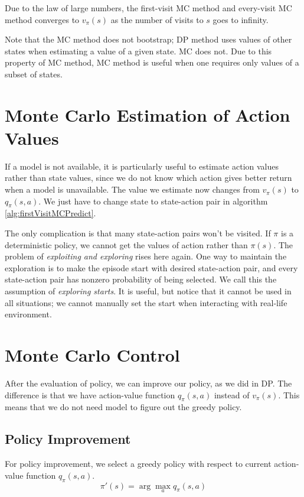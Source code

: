\documentclass[../../main.tex]{subfiles}
\begin{document}
    Due to the law of large numbers, the first-visit MC method and every-visit MC method converges to $v_\pi(s)$ as the number of visits to $s$ goes to infinity.

    Note that the MC method does not bootstrap; DP method uses values of other states when estimating a value of a given state. MC does not.
    Due to this property of MC method, MC method is useful when one requires only values of a subset of states.

\section{Monte Carlo Estimation of Action Values}
    If a model is not available, it is particularly useful to estimate action values rather than state values,
    since we do not know which action gives better return when a model is unavailable.
    The value we estimate now changes from $v_\pi(s)$ to $q_\pi(s,a)$. We just have to change state to state-action pair in algorithm \ref{alg:firstVisitMCPredict}.
    
    The only complication is that many state-action pairs won't be visited. If $\pi$ is a deterministic policy, we cannot get the
    values of action rather than $\pi(s)$. The problem of \emph{exploiting and exploring} rises here again. One way to maintain the exploration is to
    make the episode start with desired state-action pair, and every state-action pair has nonzero probability of being selected.
    We call this the assumption of \emph{exploring starts}. It is useful, but notice that it cannot be used in all situations; we cannot manually set the
    start when interacting with real-life environment.

\section{Monte Carlo Control}
    After the evaluation of policy, we can improve our policy, as we did in DP. The difference is that we have action-value function $q_\pi(s,a)$ instead of $v_\pi(s)$.
    This means that we do not need model to figure out the greedy policy.

    \subsection{Policy Improvement}
        For policy improvement, we select a greedy policy with respect to current action-value function $q_\pi(s,a)$.
        \begin{equation}
            \pi'(s) = \arg\max_a q_\pi(s,a)
        \end{equation}
\end{document}
